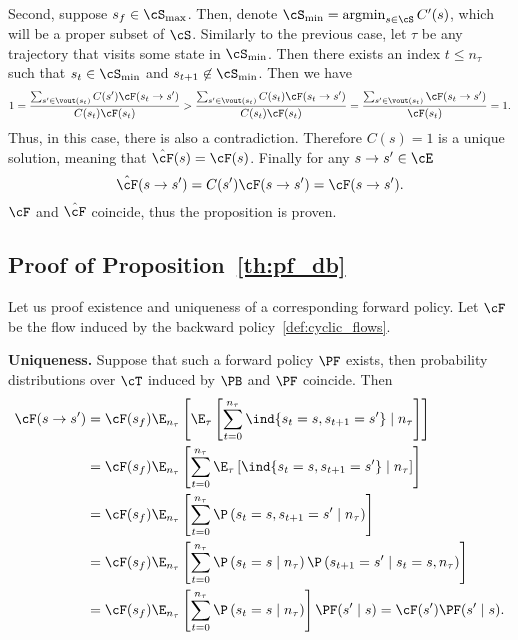 Second, suppose $s_f \in \cS_{\operatorname{max}}$. Then, denote $\cS_{\operatorname{min}} = \operatorname{argmin}\limits_{s \in \cS} C'(s)$, which will be a proper subset of $\cS$. Similarly to the previous case, let $\tau$ be any trajectory that visits some state in $\cS_{\operatorname{min}}$. Then there exists an index $t \le n_\tau$ such that $s_t \in \cS_{\operatorname{min}}$ and $s_{t+1} \not\in \cS_{\operatorname{min}}$. Then we have
$$
1 = \frac{\sum_{s' \in \vout(s_t)} C(s')\cF(s_t \to s') }{C(s_t)\cF(s_t)} > \frac{\sum_{s' \in \vout(s_t)} C(s_t)\cF(s_t \to s') }{C(s_t)\cF(s_t)} = \frac{\sum_{s' \in \vout(s_t)} \cF(s_t \to s') }{\cF(s_t)} = 1.
$$
Thus, in this case, there is also a contradiction. Therefore $C(s) = 1$ is a unique solution, meaning that $\hat{\cF}(s) = \cF(s)$. Finally for any $s \to s' \in \cE$
$$
\hat{\cF}(s \to s') = C(s')\cF(s \to s') = \cF(s \to s').
$$
$\cF$ and $\hat{\cF}$ coincide, thus the proposition is proven.




\subsection{Proof of Proposition~\ref{th:pf_db}}\label{app:pf_db_proof}

Let us proof existence and uniqueness of a corresponding forward policy. Let $\cF$ be the flow induced by the backward policy~\eqref{def:cyclic_flows}.

\textbf{Uniqueness.} Suppose that such a forward policy $\PF$ exists, then probability distributions over $\cT$ induced by $\PB$ and $\PF$ coincide. Then
\begin{equation*} %
\begin{split}
\cF(s \to s') & = \cF(s_f)\E_{n_\tau} \left[ \E_\tau\left[ \sum_{t = 0}^{n_{\tau}} \ind\{s_{t} = s, s_{t+1} = s'\} \mid n_\tau\right] \right]  \\
 & = \cF(s_f)\E_{n_\tau} \left[ \sum_{t = 0}^{n_{\tau}} \E_\tau\left[  \ind\{s_{t} = s, s_{t+1} = s'\} \mid n_\tau\right] \right] \\
 & = \cF(s_f)\E_{n_\tau} \left[ \sum_{t = 0}^{n_{\tau}} \P\left(s_{t} = s, s_{t+1} = s' \mid n_\tau\right) \right]  \\
  & = \cF(s_f)\E_{n_\tau} \left[ \sum_{t = 0}^{n_{\tau}} \P\left(s_{t} = s \mid n_\tau\right) \P\left(s_{t+1} = s' \mid s_{t} = s, n_\tau\right) \right]  \\
  & = \cF(s_f)\E_{n_\tau} \left[ \sum_{t = 0}^{n_{\tau}} \P\left(s_{t} = s \mid n_\tau\right) \right] \PF(s' \mid s) = \cF(s') \PF(s' \mid s).\\
\end{split}
\end{equation*}


